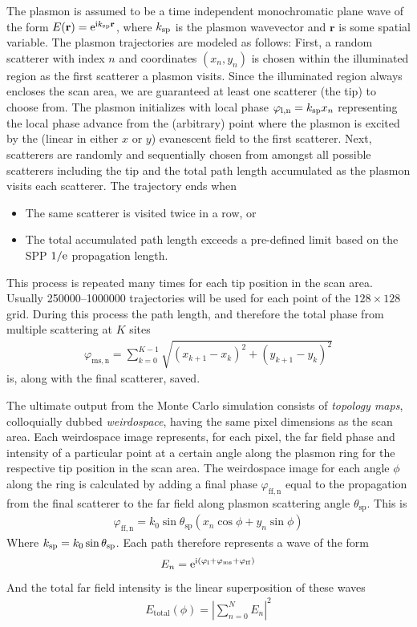 The plasmon is assumed to be a time independent monochromatic plane wave
of the form $E(\mathbf{r})={\mathrm{e}}^{{\mathrm{i}} k_\mathrm{sp}\mathbf{r}}$, where
$k_\mathrm{sp}$ is the plasmon wavevector and $\mathbf{r}$ is some
spatial variable.  The plasmon trajectories are modeled as follows:
First, a random scatterer with index $n$ and coordinates $(x_n,y_n)$ is
chosen within the illuminated region as the first scatterer a plasmon
visits.  Since the illuminated region always encloses the scan area, we are
guaranteed at least one scatterer (the tip) to choose from.  The plasmon
initializes with local phase $\varphi_\mathrm{l,n}=k_\mathrm{sp} x_n$
representing the local phase advance from the (arbitrary) point where the
plasmon is excited by the (linear in either $x$ or $y$) evanescent field to
the first scatterer.  Next, scatterers are randomly and sequentially chosen
from amongst all possible scatterers including the tip and the total path
length accumulated as the plasmon visits each scatterer.  The trajectory
ends when
\begin{itemize}
\item The same scatterer is visited twice in a row, or
\item The total accumulated path length exceeds a pre-defined limit based
				on the SPP $1/{\mathrm{e}}$ propagation length.  
\end{itemize}
This process is repeated many times for each tip position in the scan area.
Usually \numrange{250000}{1000000} trajectories will be used for each point
of the $128\times128$ grid.  During this process the path length, and
therefore the total phase from multiple scattering at $K$ sites
\begin{align}
\varphi_\mathrm{ms,n}=\sum_{k=0}^{K-1} \sqrt{(x_{k+1}-x_k)^2+(y_{k+1}-y_k)^2}
\end{align}
is, along with the final scatterer, saved.

The ultimate output from the Monte Carlo simulation consists of {\it
topology maps}, colloquially dubbed {\it weirdospace}, having the same pixel
dimensions as the scan area.  Each weirdospace image represents, for each
pixel, the far field phase and intensity of a particular point at a certain
angle along the plasmon ring for the respective tip position in the scan
area.  The weirdospace image for each angle $\phi$ along the ring is
calculated by adding a final phase $\varphi_\mathrm{ff,n}$ equal to the
propagation from the final scatterer to the far field along plasmon
scattering angle $\theta_\mathrm{sp}$.  This is 
\begin{align}
\varphi_\mathrm{ff,n} = k_0 \sin
\theta_\mathrm{sp}\left(x_n\cos\phi+y_n\sin\phi\right)
\end{align}
Where $k_\mathrm{sp}=k_0\sin \theta_\mathrm{sp}$.  Each path therefore
represents a wave of the form
\begin{align}
E_n={\mathrm{e}}^{{\mathrm{i}}(\varphi_\mathrm{l}+\varphi_\mathrm{ms}+\varphi_\mathrm{ff})}
\end{align}
And the total far field intensity is the linear superposition of these
waves
\begin{align}
E_\mathrm{total}(\phi) = 
\left|\sum_{n=0}^{N} E_n\right|^2
\end{align}

